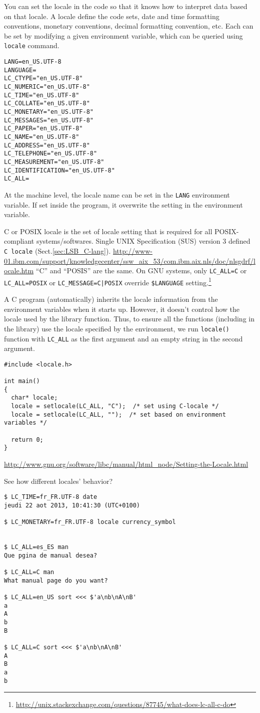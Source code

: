 You can set the locale in the code so that it knows how to interpret data based
on that locale. A locale define the code sets, date and time formatting conventions,
monetary conventions, decimal formatting convention, etc. Each can be set by
modifying a given environment variable, which can be
queried using \verb!locale! command.
\begin{verbatim}
LANG=en_US.UTF-8
LANGUAGE=
LC_CTYPE="en_US.UTF-8"
LC_NUMERIC="en_US.UTF-8"
LC_TIME="en_US.UTF-8"
LC_COLLATE="en_US.UTF-8"
LC_MONETARY="en_US.UTF-8"
LC_MESSAGES="en_US.UTF-8"
LC_PAPER="en_US.UTF-8"
LC_NAME="en_US.UTF-8"
LC_ADDRESS="en_US.UTF-8"
LC_TELEPHONE="en_US.UTF-8"
LC_MEASUREMENT="en_US.UTF-8"
LC_IDENTIFICATION="en_US.UTF-8"
LC_ALL=
\end{verbatim}
At the machine level, the locale name can be set in the \verb!LANG! environment
variable. If set inside the program, it overwrite the setting in the environment
variable. 

C or POSIX locale is the set of locale setting that is required for all
POSIX-compliant systems/softwares. Single UNIX Specification (SUS) version 3
defined \verb!C locale! (Sect.\ref{sec:LSB_C-lang}).  
\url{http://www-01.ibm.com/support/knowledgecenter/ssw_aix_53/com.ibm.aix.nls/doc/nlsgdrf/locale.htm}
``C'' and ``POSIS'' are the same. 
On GNU systems, only \verb!LC_ALL=C! or \verb!LC_ALL=POSIX! or
\verb!LC_MESSAGE=C|POSIX! override \verb!$LANGUAGE!
setting.\footnote{\url{http://unix.stackexchange.com/questions/87745/what-does-lc-all-c-do}} 

A C program (automatically) inherits the locale information from the environment
variables when it starts up. However, it doesn't control how the locale used by
the library function. Thus, to ensure all the functions (including in the
library) use the locale specified by the environment, we run \verb!locale()!
function with \verb!LC_ALL! as the first argument and an empty string in the
second argument.

\begin{verbatim}
#include <locale.h>

int main()
{
  char* locale;
  locale = setlocale(LC_ALL, "C");  /* set using C-locale */
  locale = setlocale(LC_ALL, "");  /* set based on environment variables */
  
  return 0;
}
\end{verbatim}
\url{http://www.gnu.org/software/libc/manual/html_node/Setting-the-Locale.html}


See how different locales' behavior?
\begin{verbatim}
$ LC_TIME=fr_FR.UTF-8 date
jeudi 22 aot 2013, 10:41:30 (UTC+0100)

$ LC_MONETARY=fr_FR.UTF-8 locale currency_symbol


$ LC_ALL=es_ES man
Que pgina de manual desea?

$ LC_ALL=C man
What manual page do you want?

$ LC_ALL=en_US sort <<< $'a\nb\nA\nB'
a
A
b
B

$ LC_ALL=C sort <<< $'a\nb\nA\nB'
A
B
a
b
\end{verbatim}


